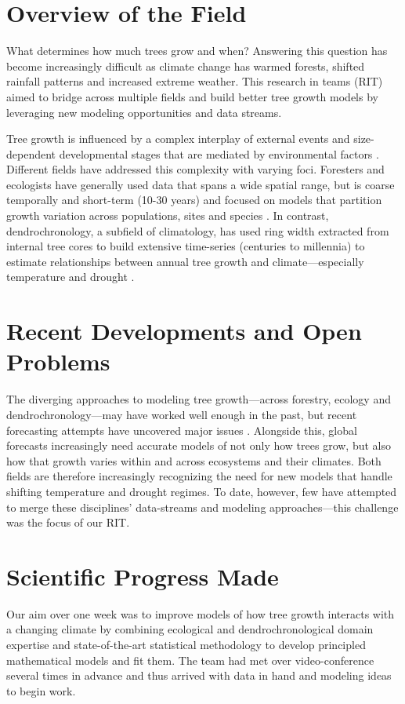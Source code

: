 \section{Overview of the Field}
What determines how much trees grow and when? Answering this question has become increasingly difficult as climate change has warmed forests, shifted rainfall patterns and increased extreme weather. This research in teams (RIT) aimed to bridge across multiple fields and build better tree growth models by leveraging new modeling opportunities and data streams. 

Tree growth is influenced by a complex interplay of  external events and size-dependent developmental stages that are mediated by environmental factors \citep{Chapin:2002nh,larcher2003}. Different fields have addressed this complexity with varying foci. Foresters and ecologists have generally used data that spans a wide spatial range, but is coarse temporally and short-term (10-30 years) and focused on models that partition growth variation across populations, sites and species \citep[e.g.,][]{zhang2017effect}. In contrast, dendrochronology, a subfield of climatology, has used ring width extracted from internal tree cores to build extensive time-series (centuries to millennia) to estimate relationships between annual tree growth and climate---especially temperature and drought \citep{cook2013methods}. 

\section{Recent Developments and Open Problems}
The diverging approaches to modeling tree growth---across forestry, ecology and dendrochronology---may have worked well enough in the past, but recent forecasting attempts have uncovered major issues \citep[e.g., the `divergence problem' in dendrochonology,][]{d2008divergence}. Alongside this, global forecasts increasingly need accurate models of not only how trees grow, but also how that growth varies within and across ecosystems and their climates. Both fields are therefore increasingly recognizing the need for new models that handle shifting temperature and drought regimes. To date, however, few have attempted to merge these disciplines' data-streams and modeling approaches---this challenge was the focus of our RIT. 

\section{Scientific Progress Made}
Our aim over one week was to improve models of how tree growth interacts with a changing climate by combining  ecological and dendrochronological domain expertise and state-of-the-art statistical methodology to develop principled mathematical models and fit them. The team had met over video-conference several times in advance and thus arrived with data in hand and modeling ideas to begin work.

